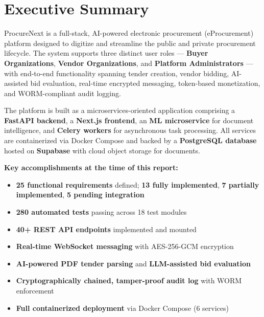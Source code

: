 \documentclass[11pt, a4paper]{article}
\begin{document}
\section{Executive Summary}

ProcureNext is a full-stack, AI-powered electronic procurement (eProcurement) platform designed to digitize and streamline the public and private procurement lifecycle. The system supports three distinct user roles --- \textbf{Buyer Organizations}, \textbf{Vendor Organizations}, and \textbf{Platform Administrators} --- with end-to-end functionality spanning tender creation, vendor bidding, AI-assisted bid evaluation, real-time encrypted messaging, token-based monetization, and WORM-compliant audit logging.

The platform is built as a microservices-oriented application comprising a \textbf{FastAPI backend}, a \textbf{Next.js frontend}, an \textbf{ML microservice} for document intelligence, and \textbf{Celery workers} for asynchronous task processing. All services are containerized via Docker Compose and backed by a \textbf{PostgreSQL database} hosted on \textbf{Supabase} with cloud object storage for documents.

\vspace{0.8em}
\noindent\textbf{Key accomplishments at the time of this report:}

\begin{itemize}[leftmargin=1.5em, itemsep=3pt]
    \item \textbf{25 functional requirements} defined; \textbf{13 fully implemented}, \textbf{7 partially implemented}, \textbf{5 pending integration}
    \item \textbf{280 automated tests} passing across 18 test modules
    \item \textbf{40+ REST API endpoints} implemented and mounted
    \item \textbf{Real-time WebSocket messaging} with AES-256-GCM encryption
    \item \textbf{AI-powered PDF tender parsing} and \textbf{LLM-assisted bid evaluation}
    \item \textbf{Cryptographically chained, tamper-proof audit log} with WORM enforcement
    \item \textbf{Full containerized deployment} via Docker Compose (6 services)
\end{itemize}


\end{document}
